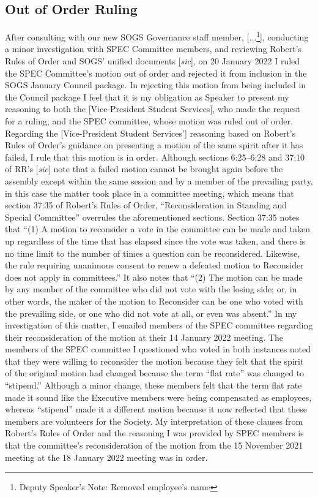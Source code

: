\begin{multicols}{2}
\subsection*{Out of Order Ruling}
After consulting with our new SOGS Governance staff member, [...\footnote{Deputy Speaker's Note: Removed employee's name}], conducting a minor investigation with SPEC Committee members, and reviewing Robert's Rules of Order and SOGS' unified documents [\emph{sic}], on 20 January 2022 I ruled the SPEC Committee's motion out of order and rejected it from inclusion in the SOGS January Council package.
In rejecting this motion from being included in the Council package I feel that it is my obligation as Speaker to present my reasoning to both the [Vice-President Student Services], who made the request for a ruling, and the SPEC committee, whose motion was ruled out of order.
Regarding the [Vice-President Student Services'] reasoning based on Robert's Rules of Order's guidance on presenting a motion of the same spirit after it has failed, I rule that this motion is in order. Although sections 6:25–6:28 and 37:10 of RR's [\emph{sic}] note that a failed motion cannot be brought again before the assembly except within the same session and by a member of the prevailing party, in this case the matter took place in a committee meeting, which means that section 37:35 of Robert's Rules of Order, ``Reconsideration in Standing and Special Committee'' overrules the aforementioned sections. Section 37:35 notes that
``(1) A motion to reconsider a vote in the committee can be made and taken up regardless of the time that has elapsed since the vote was taken, and there is no time limit to the number of times a question can be reconsidered. Likewise, the rule requiring unanimous consent to renew a defeated motion to Reconsider does not apply in committees.''
It also notes that ``(2) The motion can be made by any member of the committee who did not vote with the losing side; or, in other words, the maker of the motion to Reconsider can be one who voted with the prevailing side, or one who did not vote at all, or even was absent.''
In my investigation of this matter, I emailed members of the SPEC committee regarding their reconsideration of the motion at their 14 January 2022 meeting. The members of the SPEC committee I questioned who voted in both instances noted that they were willing to reconsider the motion because they felt that the spirit of the original motion had changed because the term ``flat rate'' was changed to ``stipend.'' Although a minor change, these members felt that the term flat rate made it sound like the Executive members were being compensated as employees, whereas ``stipend'' made it a different motion because it now reflected that these members are volunteers for the Society. My interpretation of these clauses from Robert's Rules of Order and the reasoning I was provided by SPEC members is that the committee's reconsideration of the motion from the 15 November 2021 meeting at the 18 January 2022 meeting was in order.

\end{multicols}

